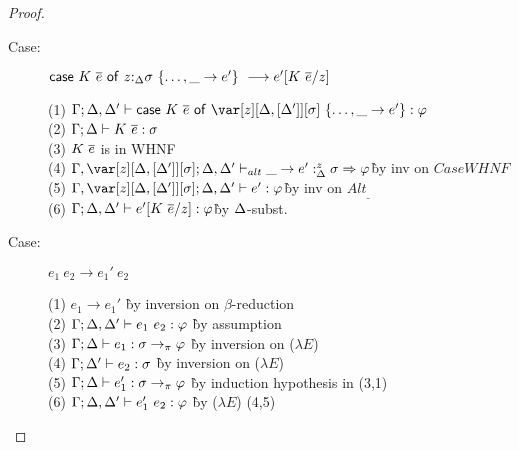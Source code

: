 \begin{proof}
\begin{description}
\begin{tabbing}
\end{tabbing}

\item[Case:]
    $\mathsf{case}~K~\overline{e}~\mathsf{of}~z{:}_{\Delta}\sigma~\{\dots,\_\to e'\}\ \longrightarrow e'[K~\overline{e}/z]$
\begin{tabbing}
    (1) $\G;\D,\D' \vdash \ccase{K~\ov{e}}{\zD~\{\dots,\_ \to e'\}} : \vp$\\
    (2) $\Gamma;\Delta \vdash K~\overline{e} : \sigma$\\
    (3) $K~\overline{e}$ is in WHNF\\
    (4) $\G,\zD;\D,\D' \vdash_{alt} \_ \to e' :^z_{\D} \s \Rightarrow \vp$\`by inv on $CaseWHNF$\\
    (5) $\G,\zD;\D,\D' \vdash e' : \vp$\`by inv on $Alt_\_$\\
    (6) $\Gamma;\Delta,\Delta' \vdash e'[K~\overline{e}/z] : \varphi$\` by $\Delta$-subst.\\
\end{tabbing}

\item[Case:] $e_1~e_2 \longrightarrow e_1'~e_2$
\begin{tabbing}
(1) $e_1 \longrightarrow e_1'$ \` by inversion on $\beta$-reduction \\
(2) $\Gamma;\Delta,\Delta' \vdash e_1~e_2 : \varphi$ \` by assumption \\
(3) $\Gamma; \Delta \vdash e_1 : \sigma \to_\pi \varphi$ \` by inversion on ($\lambda E$) \\
(4) $\Gamma; \Delta' \vdash e_2 : \sigma$ \` by inversion on ($\lambda E$) \\
(5) $\Gamma; \Delta \vdash e_1' : \sigma \to_\pi \varphi$ \` by induction hypothesis in (3,1) \\
(6) $\Gamma; \Delta, \Delta' \vdash e_1'~e_2 : \varphi$ \` by ($\lambda E$) (4,5) \\
\end{tabbing}


\end{description}
\end{proof}
